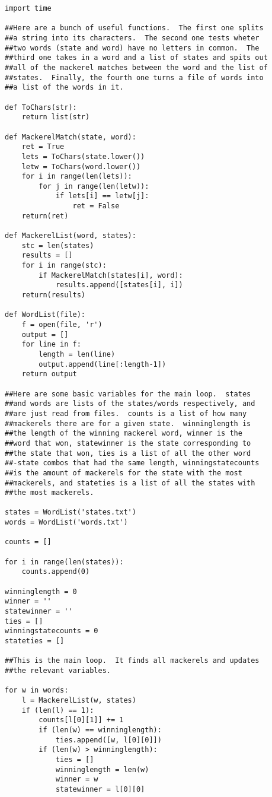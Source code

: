 \documentclass[11pt]{article}
\theoremstyle{definition}
\begin{document}
\begin{verbatim}
import time

##Here are a bunch of useful functions.  The first one splits
##a string into its characters.  The second one tests wheter
##two words (state and word) have no letters in common.  The
##third one takes in a word and a list of states and spits out
##all of the mackerel matches between the word and the list of
##states.  Finally, the fourth one turns a file of words into
##a list of the words in it.

def ToChars(str):
    return list(str)

def MackerelMatch(state, word):
    ret = True
    lets = ToChars(state.lower())
    letw = ToChars(word.lower())
    for i in range(len(lets)):
        for j in range(len(letw)):
            if lets[i] == letw[j]:
                ret = False
    return(ret)

def MackerelList(word, states):
    stc = len(states)
    results = []
    for i in range(stc):
        if MackerelMatch(states[i], word):
            results.append([states[i], i])
    return(results)

def WordList(file):
    f = open(file, 'r')
    output = []
    for line in f:
        length = len(line)
        output.append(line[:length-1])
    return output

##Here are some basic variables for the main loop.  states
##and words are lists of the states/words respectively, and
##are just read from files.  counts is a list of how many
##mackerels there are for a given state.  winninglength is
##the length of the winning mackerel word, winner is the
##word that won, statewinner is the state corresponding to
##the state that won, ties is a list of all the other word
##-state combos that had the same length, winningstatecounts
##is the amount of mackerels for the state with the most
##mackerels, and stateties is a list of all the states with
##the most mackerels.

states = WordList('states.txt')
words = WordList('words.txt')

counts = []

for i in range(len(states)):
    counts.append(0)

winninglength = 0
winner = ''
statewinner = ''
ties = []
winningstatecounts = 0
stateties = []

##This is the main loop.  It finds all mackerels and updates
##the relevant variables.

for w in words:
    l = MackerelList(w, states)
    if (len(l) == 1):
        counts[l[0][1]] += 1
        if (len(w) == winninglength):
            ties.append([w, l[0][0]])
        if (len(w) > winninglength):
            ties = []
            winninglength = len(w)
            winner = w
            statewinner = l[0][0]


\end{verbatim}
\end{document}
